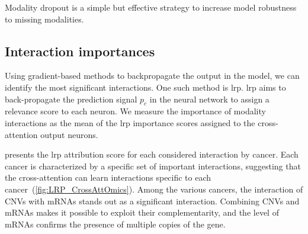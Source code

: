 \documentclass[../main.tex]{subfiles}
\begin{document}
		Modality dropout is a simple but effective strategy to increase model robustness to missing modalities.

	\subsection{Interaction importances}
		Using gradient-based methods to backpropagate the output in the model, we can identify the most significant interactions.
		One such method is \gls{lrp}.
		\Gls{lrp} aims to back-propagate the prediction signal \(p_c\) in the neural network to assign a relevance score to each neuron.
		We measure the importance of modality interactions as the mean of the \gls{lrp} importance scores assigned to the cross-attention output neurons.

		 presents the \gls{lrp} attribution score for each considered interaction by cancer.
		Each cancer is characterized by a specific set of important interactions, suggesting that the cross-attention can learn interactions specific to each cancer~(\cref{fig:LRP_CrossAttOmics}).
		Among the various cancers, the interaction of CNVs with mRNAs stands out as a significant interaction.
		Combining CNVs and mRNAs makes it possible to exploit their complementarity, and the level of mRNAs confirms the presence of multiple copies of the gene.
\end{document}
